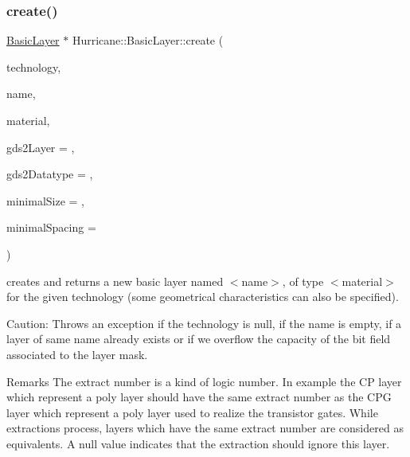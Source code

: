 \subsubsection{\texorpdfstring{create()}{create()}}
{\footnotesize\ttfamily \mbox{\hyperlink{classHurricane_1_1BasicLayer}{Basic\+Layer}} $\ast$ Hurricane\+::\+Basic\+Layer\+::create (\begin{DoxyParamCaption}\item[{\mbox{\hyperlink{classHurricane_1_1Technology}{Technology}} $\ast$}]{technology,  }\item[{const \mbox{\hyperlink{classHurricane_1_1Name}{Name}} \&}]{name,  }\item[{const \mbox{\hyperlink{classHurricane_1_1BasicLayer_1_1Material}{Material}} \&}]{material,  }\item[{unsigned}]{gds2\+Layer = {},  }\item[{unsigned}]{gds2\+Datatype = {},  }\item[{const \mbox{\hyperlink{group__DbUGroup_ga4fbfa3e8c89347af76c9628ea06c4146}{Db\+U\+::\+Unit}} \&}]{minimal\+Size = {},  }\item[{const \mbox{\hyperlink{group__DbUGroup_ga4fbfa3e8c89347af76c9628ea06c4146}{Db\+U\+::\+Unit}} \&}]{minimal\+Spacing = {} }\end{DoxyParamCaption})\hspace{0.3cm}{\ttfamily [static]}}

creates and returns a new basic layer named {\ttfamily $<$name$>$}, of type {\ttfamily $<$material$>$} for the given technology (some geometrical characteristics can also be specified).

\begin{DoxyParagraph}{Caution\+: Throws an exception if the technology is null, if the name is }
empty, if a layer of same name already exists or if we overflow the capacity of the bit field associated to the layer mask.
\end{DoxyParagraph}
\begin{DoxyRemark}{Remarks}
The extract number is a kind of logic number. In example the CP layer which represent a poly layer should have the same extract number as the C\+PG layer which represent a poly layer used to realize the transistor gates. While extractions process, layers which have the same extract number are considered as equivalents. A null value indicates that the extraction should ignore this layer. 
\end{DoxyRemark}
\mbox{\label{classHurricane_1_1BasicLayer_aeb7fd37db4ecf8e56e1992d6350fac58}} 
